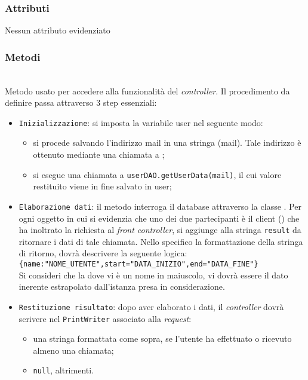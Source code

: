 \subsubsection*{Attributi}

Nessun attributo evidenziato

\subsubsection*{Metodi}
\begin{description}
	
	\item{}\\
	Metodo usato per accedere alla funzionalità del \textit{controller}. Il procedimento da definire passa attraverso 3 step essenziali:
	\begin{itemize}
		\item \texttt{Inizializzazione}: si imposta la variabile user nel seguente modo:
			\begin{itemize}
				\item si procede salvando l'indirizzo mail in una stringa (mail). Tale indirizzo è ottenuto mediante una chiamata a ;
				\item si esegue una chiamata a \texttt{userDAO.getUserData(mail)}, il cui valore restituito viene in fine salvato in user;
			\end{itemize}
		\item \texttt{Elaborazione dati}: il metodo interroga il database attraverso la classe . Per ogni oggetto  in cui si evidenzia che uno dei due partecipanti è il client () che ha inoltrato la richiesta al \textit{front controller}, si aggiunge alla stringa \texttt{result} da ritornare i dati di tale chiamata. Nello specifico la formattazione della stringa di ritorno, dovrà descrivere la seguente logica:\\
		
		\verb|{name:"NOME_UTENTE",start="DATA_INIZIO",end="DATA_FINE"}|\\
		
		Si consideri che la dove vi è un nome in maiuscolo, vi dovrà essere il dato inerente estrapolato dall'istanza  presa in considerazione.
		\item \texttt{Restituzione risultato}: dopo aver elaborato i dati, il \textit{controller} dovrà scrivere nel \texttt{PrintWriter} associato alla \textit{request}:
			\begin{itemize}
				\item una stringa formattata come sopra, se l'utente ha effettuato o ricevuto almeno una chiamata;
				\item \texttt{null}, altrimenti.
			\end{itemize}
	\end{itemize}

\end{description}

